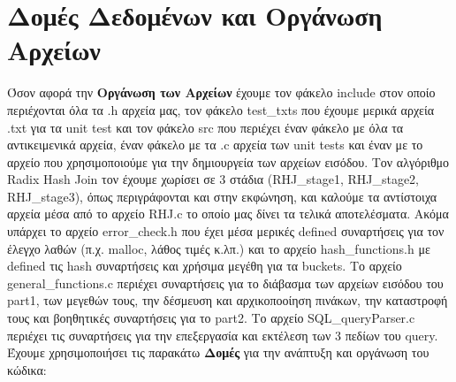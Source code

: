 \documentclass[12pt, a4paper]{article}
\begin{document}
\section{Δομές Δεδομένων και Οργάνωση Αρχείων}
Όσον αφορά την \textbf{Οργάνωση των Αρχείων} έχουμε τον φάκελο include στον οποίο περιέχονται όλα τα .h αρχεία μας, τον φάκελο test\_txts που έχουμε μερικά αρχεία .txt για τα unit test και τον φάκελο src που περιέχει έναν φάκελο με όλα τα αντικειμενικά αρχεία, έναν φάκελο με τα .c αρχεία των unit tests και έναν με το αρχείο που χρησιμοποιούμε για την δημιουργεία των αρχείων εισόδου. Τον αλγόριθμο Radix Hash Join τον έχουμε χωρίσει σε 3 στάδια (RHJ\_stage1, RHJ\_stage2, RHJ\_stage3), όπως περιγράφονται και στην εκφώνηση, και καλούμε τα αντίστοιχα αρχεία μέσα από το αρχείο RHJ.c το οποίο μας δίνει τα τελικά αποτελέσματα. Aκόμα υπάρχει το αρχείο error\_check.h που έχει μέσα μερικές defined συναρτήσεις για τον έλεγχο λαθών (π.χ. malloc, λάθος τιμές κ.λπ.) και το αρχείο hash\_functions.h με defined τις hash συναρτήσεις και χρήσιμα μεγέθη για τα buckets. Το αρχείο general\_functions.c περιέχει συναρτήσεις για το διάβασμα των αρχείων εισόδου του part1, των μεγεθών τους, την δέσμευση και αρχικοποοίηση πινάκων, την καταστροφή τους και βοηθητικές συναρτήσεις για το part2. Το αρχείο SQL\_queryParser.c περιέχει τις συναρτήσεις για την επεξεργασία και εκτέλεση των 3 πεδίων του query.\\
Έχουμε χρησιμοποιήσει τις παρακάτω \textbf{Δομές} για την ανάπτυξη και οργάνωση του κώδικα:
\end{document}
